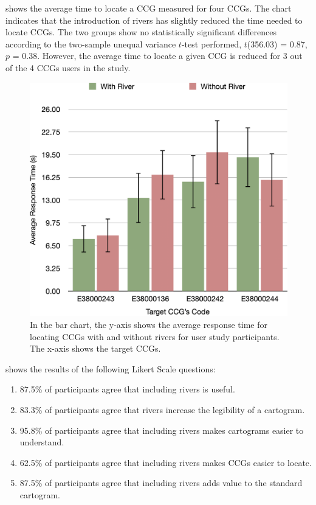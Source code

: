   shows the average time to locate a CCG measured for four CCGs. The chart indicates that the introduction of rivers has slightly reduced the time needed to locate CCGs. The two groups show no statistically significant differences according to the two-sample unequal variance $t$-test performed, $t$(356.03) = 0.87, $p$ = 0.38. However, the average time to locate a given CCG is reduced for 3 out of the 4 CCGs users in the study.

    {
        \begin{figure}[t!]
            \centering
            \includegraphics[width=\columnwidth,keepaspectratio]{figure/evaluation/rt.png}
            \caption{In the bar chart, the y-axis shows the average response time for locating CCGs with and without rivers for user study participants. The x-axis shows the target CCGs.}
            \label{fig:task-rt}
        \end{figure}
    }

  shows the results of the following Likert Scale questions:
\begin{enumerate}[label=(\Alph*),align=left,leftmargin=*,labelindent=1em]
    \item 87.5\% of participants agree that including rivers is useful.
    \item 83.3\% of participants agree that rivers increase the legibility of a cartogram.
    \item 95.8\% of participants agree that including rivers makes cartograms easier to understand.
    \item 62.5\% of participants agree that including rivers makes CCGs easier to locate.
    \item 87.5\% of participants agree that including rivers adds value to the standard cartogram.
\end{enumerate}

